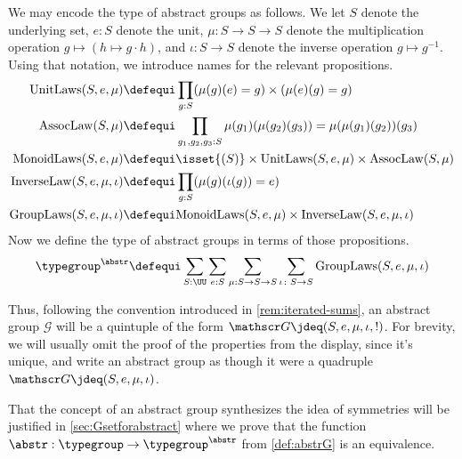 \begin{remark}
  \label{rem:typemonoidabstrgp}
  We may encode the type of abstract groups as follows. 
  We let $S$ denote the underlying set, $e : S$ denote the unit, 
  $\mu:S\to S\to S$ denote the multiplication operation 
  $g\mapsto (h \mapsto g\cdot h)$, and $\iota : S \to S$ denote 
  the inverse operation $g \mapsto g^{-1}$.  Using
  that notation, we introduce names for the relevant propositions.
  \begin{align*}
    \mathrm{UnitLaws}(S,e,\mu)   & \defequi\prod_{g:S} (\mu{}(g)(e) = g)\times(\mu{}(e)(g) = g) \\
    \mathrm{AssocLaw}(S,\mu{})   & \defequi\prod_{g_1,g_2,g_3:S} \mu{}(g_1)(\mu{}(g_2)(g_3))=\mu{}(\mu{}(g_1)(g_2))(g_3) \\
    \mathrm{MonoidLaws}(S,e,\mu) & \defequi \isset{(S)} \times \mathrm{UnitLaws}(S,e,\mu) \times \mathrm{AssocLaw}(S,\mu{}) \\
    \mathrm{InverseLaw}(S,e,\mu,\iota) & \defequi \prod_{g:S}(\mu(g)(\iota(g)) = e) \\
    \mathrm{GroupLaws}(S,e,\mu,\iota) & \defequi \mathrm{MonoidLaws}(S,e,\mu) \times \mathrm{InverseLaw}(S,e,\mu,\iota)
  \end{align*}
  Now we define the type of abstract groups in terms of those propositions.
  \[
    \typegroup^\abstr \defequi \sum_{S:\UU} \sum_{e:S}\sum_{\mu{}:S\to S\to S}
    \sum_{\iota\colon S\to S} \mathrm{GroupLaws}(S,e,\mu,\iota)
  \]

  Thus, following the convention introduced in \cref{rem:iterated-sums},
  an abstract group $\mathscr G$ will be a quintuple of the form
  $\mathscr G \jdeq (S,e,\mu,\iota,!)$.  For brevity, we will usually 
  omit the proof of the properties from the display, since it's unique,
  and write an abstract group as though it were a quadruple 
  $\mathscr G \jdeq (S,e,\mu,\iota)$.
\end{remark}

\begin{remark}
  That the concept of an abstract group synthesizes the idea of symmetries
  will be justified in \cref{sec:Gsetforabstract} where we prove that
  the function $\abstr:\typegroup\to\typegroup^\abstr$ from 
  \cref{def:abstrG} is an equivalence.
\end{remark}

